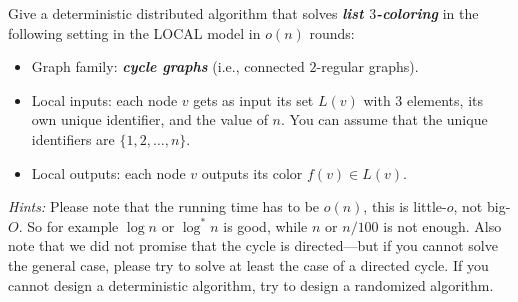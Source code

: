 \documentclass[12pt,a4paper]{article}
\newcommand{\cemph}[1]{\textbf{\emph{\boldmath #1}}}
\begin{document}
Give a deterministic distributed algorithm that solves \cemph{list $3$-coloring} in the following setting in the LOCAL model in \cemph{$o(n)$} rounds:
\begin{itemize}
    \item Graph family: \cemph{cycle graphs} (i.e., connected $2$-regular graphs).
    \item Local inputs: each node $v$ gets as input its set $L(v)$ with $3$ elements, its own unique identifier, and the value of $n$. You can assume that the unique identifiers are $\{1,2,\dotsc,n\}$.
    \item Local outputs: each node $v$ outputs its color $f(v) \in L(v)$.
\end{itemize}
\emph{Hints:} Please note that the running time has to be $o(n)$, this is little-$o$, not big-$O$. So for example $\log n$ or $\log^* n$ is good, while $n$ or $n/100$ is not enough. Also note that we did not promise that the cycle is directed---but if you cannot solve the general case, please try to solve at least the case of a directed cycle. If you cannot design a deterministic algorithm, try to design a randomized algorithm.
\end{document}
